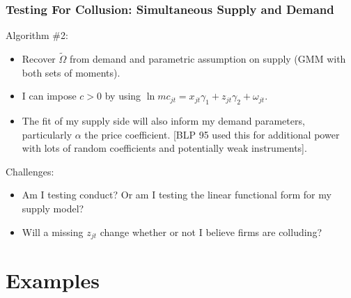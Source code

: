 \documentclass[xcolor=pdftex,dvipsnames,table,mathserif]{beamer}
\begin{document}
\begin{frame}
\frametitle{Testing For Collusion: Simultaneous Supply and Demand}
Algorithm \#2:
\begin{itemize}
\item Recover $\tilde{\Omega}$ from demand and parametric assumption on supply (GMM with both sets of moments).
\item I can impose $c > 0$ by using $\ln mc_{jt} = x_{jt} \gamma_1 + z_{jt} \gamma_2 + \omega_{jt}$.
\item The fit of my supply side will also inform my demand parameters, particularly $\alpha$ the price coefficient. [BLP 95 used this for additional power with lots of random coefficients and potentially weak instruments].
\end{itemize}
Challenges:
\begin{itemize}
\item Am I testing conduct? Or am I testing the linear functional form for my supply model?
\item Will a missing $z_{jt}$ change whether or not I believe firms are colluding?
\end{itemize}
\end{frame}

\section{Examples}
\end{document}
